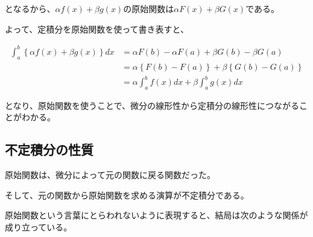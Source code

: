 \documentclass[../math-imaging]{subfiles}
\begin{document}
となるから、$\alpha f(x) + \beta g(x)$の原始関数は$\alpha F(x) + \beta G(x)$である。

よって、定積分を原始関数を使って書き表すと、

\begin{align}
  \int_{a}^{b} \left\{ \alpha f(x) + \beta g(x) \right\} dx & = \alpha F(b) - \alpha F(a) + \beta G(b) - \beta G(a)                      \\
                                                            & = \alpha \left\{ F(b) - F(a) \right\} + \beta \left\{ G(b) - G(a) \right\} \\
                                                            & = \alpha \int_{a}^{b} f(x) dx + \beta \int_{a}^{b} g(x) dx
\end{align}

となり、原始関数を使うことで、微分の線形性から定積分の線形性につながることがわかる。

\subsection{不定積分の性質}

原始関数は、微分によって元の関数に戻る関数だった。

そして、元の関数から原始関数を求める演算が不定積分である。

\begin{center}
\end{center}

原始関数という言葉にとらわれないように表現すると、結局は次のような関係が成り立っている。

\begin{center}
\end{center}
\end{document}
